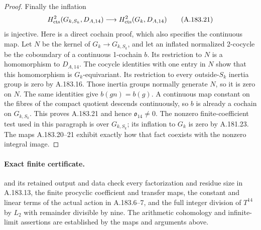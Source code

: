\begin{proof}
Finally the inflation
\[
 H^2_{\rm cts}(G_{k,S_k},D_{A,14})
       \longrightarrow H^2_{\rm cts}(G_k,D_{A,14})
\tag{A.183.21}
\]
is injective.  Here is a direct cochain proof, which also
specifies the continuous map.  Let \(N\) be the kernel of
\(G_k\to G_{k,S_k}\), and let an inflated normalized
2-cocycle be the coboundary of a continuous 1-cochain \(b\).
Its restriction to \(N\) is a homomorphism to \(D_{A,14}\).
The cocycle identities with one entry in \(N\) show that
this homomorphism is \(G_k\)-equivariant.  Its restriction
to every outside-\(S_k\) inertia group is zero by A.183.16.
Those inertia groups normally generate \(N\), so it is zero
on \(N\).  The same identities give \(b(gn)=b(g)\).
A continuous map constant on the fibres of the compact
quotient descends continuously, so \(b\) is already a
cochain on \(G_{k,S_k}\).  This proves A.183.21 and hence
\(\mathfrak o_{14}\ne0\).
The nonzero finite-coefficient test used in this paragraph
is over \(G_{k,S_k}\); its inflation to \(G_k\) is zero
by A.181.23.  The maps A.183.20--21 exhibit exactly how
that fact coexists with the nonzero integral image.
\end{proof}

\paragraph{Exact finite certificate.}
 and its retained
output and data check every factorization and residue size in
A.183.13, the finite procyclic coefficient and transfer maps,
the constant and linear terms of the actual action in
A.183.6--7, and the full integer division of \(T^{14}\) by
\(L_2\) with remainder divisible by nine.  The arithmetic cohomology and infinite-limit
assertions are established by the maps and arguments above.

